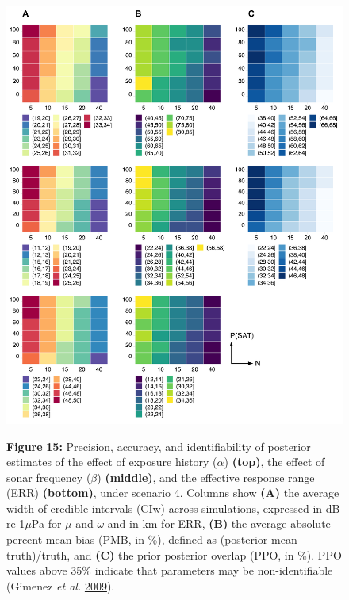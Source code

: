 \documentclass[
]{article}
\begin{document}
\begin{figure}

{\centering \includegraphics[width=0.9\linewidth]{fig/fig_heatplot_S4} 

}

\textbf{Figure }{\textbf{15:} \hypertarget{fig15}{}Precision, accuracy, and identifiability of posterior estimates of the effect of exposure history (\(\alpha\)) \textbf{(top)}, the effect of sonar frequency (\(\beta\)) \textbf{(middle)}, and the effective response range (ERR) \textbf{(bottom)}, under scenario 4. Columns show \textbf{(A)} the average width of credible intervals (CIw) across simulations, expressed in dB re 1\(\mu\)Pa for \(\mu\) and \(\omega\) and in km for ERR, \textbf{(B)} the average absolute percent mean bias (PMB, in \%), defined as (posterior mean-truth)/truth, and \textbf{(C)} the prior posterior overlap (PPO, in \%). PPO values above 35\% indicate that parameters may be non-identifiable (Gimenez \emph{et al.} \protect\hyperlink{ref-Gimenez2009}{2009}).}\label{fig:unnamed-chunk-14}
\end{figure}
\end{document}

